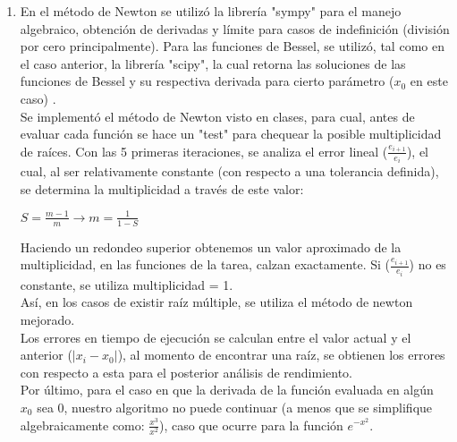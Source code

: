 \documentclass[spanish, fleqn]{article}
\begin{document}
\begin{enumerate}
		\item
			En el método de Newton se utilizó la librería "sympy" para el
			manejo algebraico, obtención de derivadas y límite para casos de
			indefinición (división por cero principalmente). Para las funciones
			de Bessel, se utilizó, tal como en el caso anterior, la librería 
			"scipy", la cual retorna las soluciones de las funciones de Bessel
			y su respectiva derivada para cierto parámetro ($x_0$ en este caso)
			.\\
			Se implementó el método de Newton visto en clases, para cual, antes
			de evaluar cada función se hace un "test" para chequear la posible
			multiplicidad de raíces. Con las 5 primeras iteraciones, se analiza
			el error lineal ($\frac{e_{i+1}}{e_{i}}$), el cual, al ser
			relativamente constante (con respecto a una tolerancia definida),
			se determina la multiplicidad a través de este valor:
			\begin{center}
				$S = \frac{m-1}{m} \rightarrow m = \frac{1}{1-S}$
			\end{center}
			Haciendo un redondeo superior obtenemos un valor aproximado de la
			multiplicidad, en las funciones de la tarea, calzan exactamente.
			Si ($\frac{e_{i+1}}{e_{i}}$) no es constante, se utiliza
			multiplicidad = 1.\\
			Así, en los casos de existir raíz múltiple, se utiliza el método
			de newton mejorado.\\
			Los errores en tiempo de ejecución se calculan entre el valor
			actual y el anterior ($|x_i - x_0|$), al momento de encontrar una
			raíz, se obtienen los errores con respecto a esta para el posterior
			análisis de rendimiento.\\
			Por último, para el caso en que la derivada de la función evaluada
			en algún $x_0$ sea 0, nuestro algoritmo no puede continuar (a menos
			que se simplifique algebraicamente como: $\frac{x^3}{x^2}$), caso
			que ocurre para la función $e^{-x^2}$.


\end{enumerate}
\end{document}
